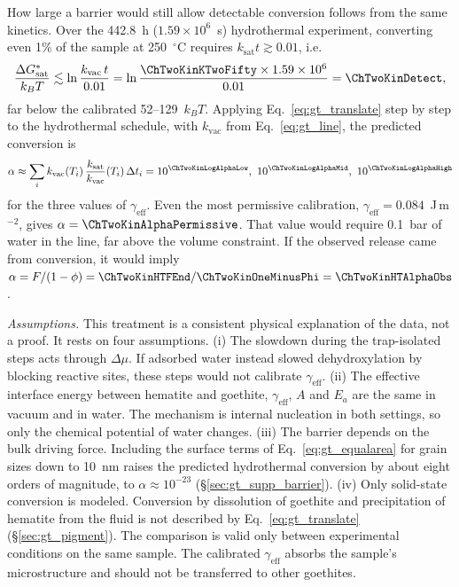 How large a barrier would still allow detectable conversion follows from the same kinetics. Over
the 442.8~h ($1.59\times10^{6}$~s) hydrothermal experiment, converting even 1\% of the sample at
250~$^\circ$C requires $k_{\mathrm{sat}}t\gtrsim0.01$, i.e.
\begin{equation}
  \frac{\Delta G^{*}_{\mathrm{sat}}}{k_BT} \lesssim \ln\frac{k_{\mathrm{vac}}\,t}{0.01}
  = \ln\frac{\ChTwoKinKTwoFifty\times1.59\times10^{6}}{0.01} = \ChTwoKinDetect ,
\end{equation}
far below the calibrated 52--129~$k_BT$. Applying Eq.~\eqref{eq:gt_translate} step by step to the
hydrothermal schedule, with $k_{\mathrm{vac}}$ from Eq.~\eqref{eq:gt_line}, the predicted conversion is
\begin{equation}
  \alpha \approx \sum_i k_{\mathrm{vac}}(T_i)\,\frac{k_{\mathrm{sat}}}{k_{\mathrm{vac}}}(T_i)\,\Delta t_i
  = 10^{\ChTwoKinLogAlphaLow},\ 10^{\ChTwoKinLogAlphaMid},\ 10^{\ChTwoKinLogAlphaHigh}
\end{equation}
for the three values of $\gamma_{\mathrm{eff}}$. Even the most permissive calibration,
$\gamma_{\mathrm{eff}} = 0.084$~J\,m$^{-2}$, gives $\alpha = \ChTwoKinAlphaPermissive$. That value would require
0.1~bar of water in the line, far above the volume constraint. If the observed release came from
conversion, it would imply $\alpha = F/(1-\phi) = \ChTwoKinHTFEnd/\ChTwoKinOneMinusPhi = \ChTwoKinHTAlphaObs$.

\textit{Assumptions.} This treatment is a consistent physical explanation of the data, not a
proof. It rests on four assumptions.
(i) The slowdown during the trap-isolated steps acts through $\Delta\mu$. If adsorbed water instead
slowed dehydroxylation by blocking reactive sites, these steps would not calibrate
$\gamma_{\mathrm{eff}}$.
(ii) The effective interface energy between hematite and goethite, $\gamma_{\mathrm{eff}}$, $A$ and $E_a$ are the same in vacuum and in water. The
mechanism is internal nucleation in both settings, so only the chemical potential of water
changes.
(iii) The barrier depends on the bulk driving force. Including the surface terms of
Eq.~\eqref{eq:gt_equalarea} for grain sizes down to 10~nm raises the predicted hydrothermal
conversion by about eight orders of magnitude, to $\alpha\approx10^{-23}$
(\S\ref{sec:gt_supp_barrier}).
(iv) Only solid-state conversion is modeled. Conversion by dissolution of goethite and
precipitation of hematite from the fluid is not described by Eq.~\eqref{eq:gt_translate}
(\S\ref{sec:gt_pigment}).
The comparison is valid only between experimental conditions on the same sample. The calibrated
$\gamma_{\mathrm{eff}}$ absorbs the sample's microstructure and should not be transferred to other
goethites.

